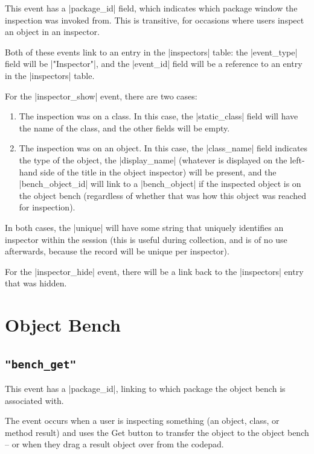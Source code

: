 \documentclass{report}
\begin{document}
This event has a |package_id| field, which indicates which package window the
inspection was invoked from.  This is transitive, for occasions where users
inspect an object in an inspector.

Both of these events link to an entry in the |inspectors| table: the
|event_type| field will be |"Inspector"|, and the |event_id| field will be a
reference to an entry in the |inspectors| table.

For the |inspector_show| event, there are two cases:

\begin{enumerate}
\item The inspection was on a class.  In this case, the |static_class| field
  will have the name of the class, and the other fields will be empty.
\item The inspection was on an object.  In this case, the |class_name| field
  indicates the type of the object, the |display_name| (whatever is displayed
  on the left-hand side of the title in the object inspector) will be present,
  and the |bench_object_id| will link to a |bench_object| if the inspected
  object is on the object bench (regardless of whether that was how this
  object was reached for inspection).
\end{enumerate}

In both cases, the |unique| will have some string that uniquely identifies an
inspector within the session (this is useful during collection, and is of no
use afterwards, because the record will be unique per inspector).

For the |inspector_hide| event, there will be a link back to the |inspectors|
entry that was hidden.

\section{Object Bench}

\subsection{\lstinline!"bench_get"!}
\label{evt:bench_get}

This event has a |package_id|, linking to which package the object
bench is associated with.

The event occurs when a user is inspecting something (an object,
class, or method result) and uses the Get button to transfer the
object to the object bench -- or when they drag a result object over
from the codepad.
  
\end{document}
